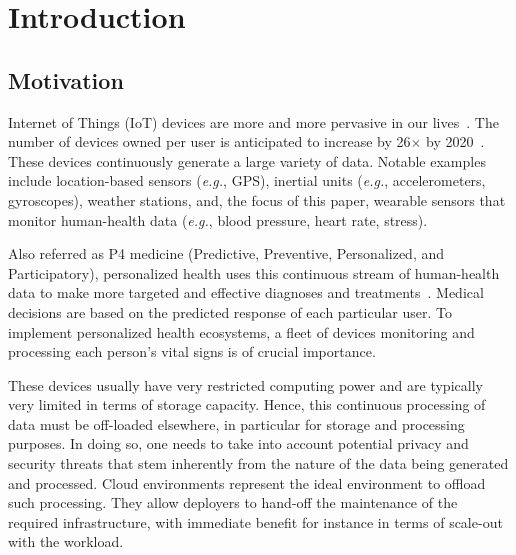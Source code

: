 \chapter{Introduction} \label{chap:introduction}

\section{Motivation}

Internet of Things (IoT) devices are more and more pervasive in our lives~\cite{Gartner2017}.
The number of devices owned per user is anticipated to increase by 26$\times$ by 2020~\cite{Barbosa2017}.
These devices continuously generate a large variety of data.
Notable examples include location-based sensors (\emph{e.g.}, GPS), inertial units (\emph{e.g.}, accelerometers, gyroscopes), weather stations, and, the focus of this paper, wearable sensors that monitor human-health data (\emph{e.g.}, blood pressure, heart rate, stress).

Also referred as P4 medicine (Predictive, Preventive, Personalized, and Participatory), personalized health uses this continuous stream of human-health data to make more targeted and effective diagnoses and treatments~\cite{Cumming2014}. 
Medical decisions are based on the predicted response of each particular user.
To implement personalized health ecosystems, a fleet of devices monitoring and processing each person's vital signs is of crucial importance.

These devices usually have very restricted computing power and are typically very limited in terms of storage capacity.
Hence, this continuous processing of data must be off-loaded elsewhere, in particular for storage and processing purposes.
In doing so, one needs to take into account potential privacy and security threats that stem inherently from the nature of the data being generated and processed.
Cloud environments represent the ideal environment to offload such processing.
They allow deployers to hand-off the maintenance of the required infrastructure, with immediate benefit for instance in terms of scale-out with the workload. 

